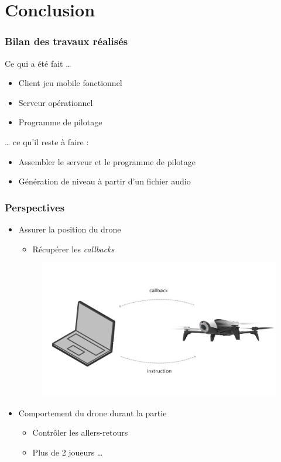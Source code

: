 \section{Conclusion}
\begin{frame}
\frametitle{Bilan des travaux réalisés}
Ce qui a été fait \dots
\begin{itemize}
\item Client jeu mobile fonctionnel
\item Serveur opérationnel
\item Programme de pilotage
\end{itemize}
\dots{} ce qu'il reste à faire :
\begin{itemize}
\item Assembler le serveur et le programme de pilotage
\item Génération de niveau à partir d'un fichier audio
\end{itemize}
\end{frame}

\begin{frame}
\frametitle{Perspectives}
\begin{center}
\begin{itemize}
\item Assurer la position du drone 
\begin{itemize}
\item Récupérer les \textit{callbacks}
\end{itemize}
\begin{figure}
\includegraphics[scale=0.06]{images/callback.jpg}
\end{figure}
\item Comportement du drone durant la partie
\begin{itemize}
\item Contrôler les allers-retours
\item Plus de 2 joueurs \dots
\end{itemize}
\end{itemize}
\end{center}
\end{frame}